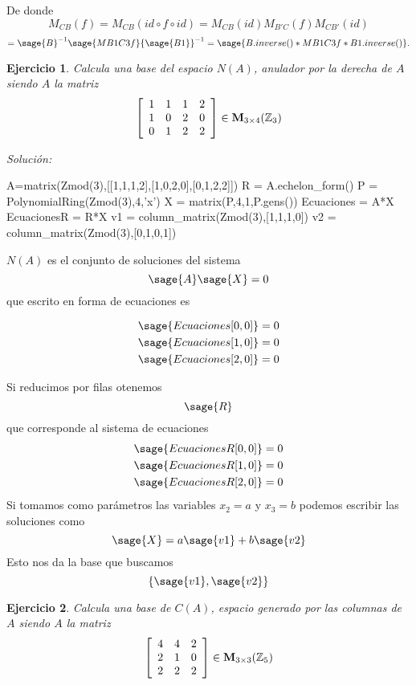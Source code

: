 \documentclass{amsart}
\newtheorem{ejer}{Ejercicio}
\begin{document}
De donde 
\[ M_{CB}(f) = M_{CB}(id\circ f\circ id) =  M_{CB}(id) M_{B'C}(f) M_{CB'}(id) \] 
\[ = {\sage{B}}^{-1}\sage{MB1C3f}{\sage{B1}}^{-1} = \sage{B.inverse()*MB1C3f*B1.inverse()}. \]



\begin{ejer} Calcula una base del espacio $N(A)$, anulador por la derecha de $A$ siendo $A$ la matriz
\[ \left[\begin{array}{rrrr}
1 & 1 & 1 & 2 \\
1 & 0 & 2 & 0 \\
0 & 1 & 2 & 2 
\end{array}\right] \in {\bf M}_{3 \times 4}({\mathbb Z}_{3})\]
\end{ejer}

{\it Soluci\'on:}
\begin{sageblock}
A=matrix(Zmod(3),[[1,1,1,2],[1,0,2,0],[0,1,2,2]])
R = A.echelon_form()
P = PolynomialRing(Zmod(3),4,'x')
X = matrix(P,4,1,P.gens())
Ecuaciones = A*X
EcuacionesR = R*X
v1 = column_matrix(Zmod(3),[1,1,1,0])
v2 = column_matrix(Zmod(3),[0,1,0,1])
\end{sageblock}

$N(A)$ es el conjunto de soluciones del sistema
$$ \sage{A} \sage{X} = 0 $$
que escrito en forma de ecuaciones es

\begin{align*}
\sage{Ecuaciones[0,0]} &= 0 \\
\sage{Ecuaciones[1,0]} &= 0 \\
\sage{Ecuaciones[2,0]} &= 0 \\
\end{align*}

Si reducimos por filas otenemos 
$$ \sage{R}$$
que corresponde al sistema de ecuaciones
\begin{align*}
\sage{EcuacionesR[0,0]} &= 0 \\
\sage{EcuacionesR[1,0]} &= 0 \\
\sage{EcuacionesR[2,0]} &= 0 \\
\end{align*}
Si tomamos como parámetros las variables $x_2 = a$ y $x_3 = b$ podemos
escribir las soluciones como 
$$ \sage{X} = a \sage{v1} + b \sage{v2} $$
Esto nos da la base que buscamos 
$$ \left\{ \sage{v1}, \sage{v2} \right\} $$


\begin{ejer} Calcula una base de $C(A)$, espacio generado por las columnas de $A$ siendo $A$ la matriz
\[ \left[\begin{array}{rrr}
4 & 4 & 2 \\
2 & 1 & 0 \\
2 & 2 & 2 
\end{array}\right] \in {\bf M}_{3 \times 3}({\mathbb Z}_{5})\]
\end{ejer}
\end{document}
